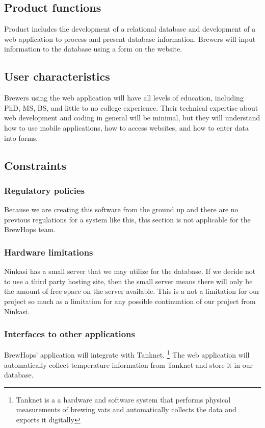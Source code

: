 \documentclass[draftclsnofoot,onecolumn,letterpaper,10pt,compsoc]{IEEEtran}
\begin{document}
	\subsection{Product functions}
		Product includes the development of a relational database and development of a web application to process and present database information.
		Brewers will input information to the database using a form on the website.

	\subsection{User characteristics}
		Brewers using the web application will have all levels of education, including PhD, MS, BS, and little to no college experience.
		Their technical expertise about web development and coding in general will be minimal, but they will understand how to use mobile applications, how to access websites, and how to enter data into forms.

	\subsection{Constraints}
		\subsubsection{Regulatory policies}
		Because we are creating this software from the ground up and there are no previous regulations for a system like this, this section is not applicable for the BrewHops team.

		\subsubsection{Hardware limitations}
		Ninkasi has a small server that we may utilize for the database.
		If we decide not to use a third party hosting site, then the small server means there will only be the amount of free space on the server available.
		This is a not a limitation for our project so much as a limitation for any possible continuation of our project from Ninkasi.

		\subsubsection{Interfaces to other applications}
		BrewHops’ application will integrate with Tanknet.
		\footnote{Tanknet is a a hardware and software system that performs physical measurements of brewing vats and automatically collects the data and exports it digitally}
		The web application will automatically collect temperature information from Tanknet and store it in our database.
\end{document}
